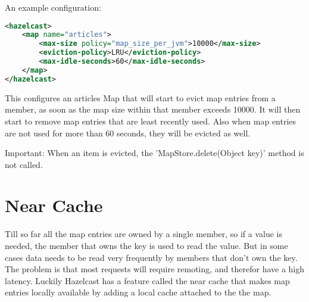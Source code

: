 An example configuration:
\begin{lstlisting}[language=xml]
<hazelcast>
    <map name="articles">
        <max-size policy="map_size_per_jvm">10000</max-size>
        <eviction-policy>LRU</eviction-policy>
        <max-idle-seconds>60</max-idle-seconds>
    </map>
</hazelcast>
\end{lstlisting}
This configures an articles Map that will start to evict map entries from a member, as soon as the map size within that member exceeds 10000. It will then start to remove map entries that are least recently used. Also when map entries are not used for more than 60 seconds, they will be evicted as well.

Important: When an item is evicted, the 'MapStore.delete(Object key)' method is not called.

\section{Near Cache}
Till so far all the map entries are owned by a single member, so if a value is needed, the member that owns the key is used to read the value. But in some cases data needs to be read very frequently by members that don't own the key. The problem is that most requests will require remoting, and therefor have a high latency. Luckily Hazelcast has a feature called the near cache that makes map entries locally available by adding a local cache attached to the the map. 

